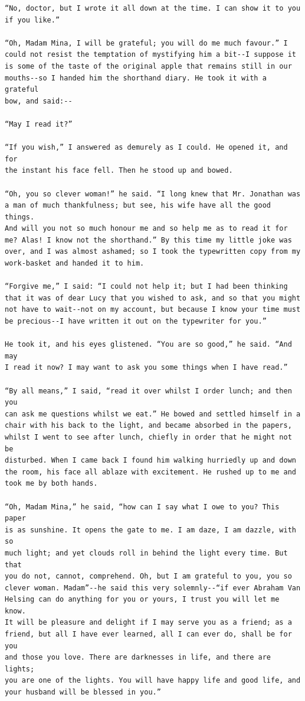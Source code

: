 \documentclass{article}
\begin{document}
\begin{verbatim}
“No, doctor, but I wrote it all down at the time. I can show it to you
if you like.”

“Oh, Madam Mina, I will be grateful; you will do me much favour.” I
could not resist the temptation of mystifying him a bit--I suppose it
is some of the taste of the original apple that remains still in our
mouths--so I handed him the shorthand diary. He took it with a grateful
bow, and said:--

“May I read it?”

“If you wish,” I answered as demurely as I could. He opened it, and for
the instant his face fell. Then he stood up and bowed.

“Oh, you so clever woman!” he said. “I long knew that Mr. Jonathan was
a man of much thankfulness; but see, his wife have all the good things.
And will you not so much honour me and so help me as to read it for
me? Alas! I know not the shorthand.” By this time my little joke was
over, and I was almost ashamed; so I took the typewritten copy from my
work-basket and handed it to him.

“Forgive me,” I said: “I could not help it; but I had been thinking
that it was of dear Lucy that you wished to ask, and so that you might
not have to wait--not on my account, but because I know your time must
be precious--I have written it out on the typewriter for you.”

He took it, and his eyes glistened. “You are so good,” he said. “And may
I read it now? I may want to ask you some things when I have read.”

“By all means,” I said, “read it over whilst I order lunch; and then you
can ask me questions whilst we eat.” He bowed and settled himself in a
chair with his back to the light, and became absorbed in the papers,
whilst I went to see after lunch, chiefly in order that he might not be
disturbed. When I came back I found him walking hurriedly up and down
the room, his face all ablaze with excitement. He rushed up to me and
took me by both hands.

“Oh, Madam Mina,” he said, “how can I say what I owe to you? This paper
is as sunshine. It opens the gate to me. I am daze, I am dazzle, with so
much light; and yet clouds roll in behind the light every time. But that
you do not, cannot, comprehend. Oh, but I am grateful to you, you so
clever woman. Madam”--he said this very solemnly--“if ever Abraham Van
Helsing can do anything for you or yours, I trust you will let me know.
It will be pleasure and delight if I may serve you as a friend; as a
friend, but all I have ever learned, all I can ever do, shall be for you
and those you love. There are darknesses in life, and there are lights;
you are one of the lights. You will have happy life and good life, and
your husband will be blessed in you.”


\end{verbatim}
\end{document}
